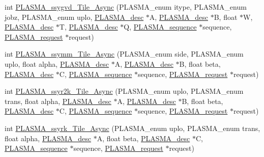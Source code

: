 \begin{DoxyCompactItemize}
\item 
int \hyperlink{group__float__Tile__Async_ga97d8d042fe9b588ddb504259c1960e44_ga97d8d042fe9b588ddb504259c1960e44}{P\+L\+A\+S\+M\+A\+\_\+ssygvd\+\_\+\+Tile\+\_\+\+Async} (P\+L\+A\+S\+M\+A\+\_\+enum itype, P\+L\+A\+S\+M\+A\+\_\+enum jobz, P\+L\+A\+S\+M\+A\+\_\+enum uplo, \hyperlink{structplasma__desc__t}{P\+L\+A\+S\+M\+A\+\_\+desc} $\ast$A, \hyperlink{structplasma__desc__t}{P\+L\+A\+S\+M\+A\+\_\+desc} $\ast$B, float $\ast$W, \hyperlink{structplasma__desc__t}{P\+L\+A\+S\+M\+A\+\_\+desc} $\ast$T, \hyperlink{structplasma__desc__t}{P\+L\+A\+S\+M\+A\+\_\+desc} $\ast$Q, \hyperlink{structplasma__sequence__t}{P\+L\+A\+S\+M\+A\+\_\+sequence} $\ast$sequence, \hyperlink{structplasma__request__t}{P\+L\+A\+S\+M\+A\+\_\+request} $\ast$request)
\item 
int \hyperlink{group__float__Tile__Async_ga0ebe5ea6bd5073337f099f5658a448d4_ga0ebe5ea6bd5073337f099f5658a448d4}{P\+L\+A\+S\+M\+A\+\_\+ssymm\+\_\+\+Tile\+\_\+\+Async} (P\+L\+A\+S\+M\+A\+\_\+enum side, P\+L\+A\+S\+M\+A\+\_\+enum uplo, float alpha, \hyperlink{structplasma__desc__t}{P\+L\+A\+S\+M\+A\+\_\+desc} $\ast$A, \hyperlink{structplasma__desc__t}{P\+L\+A\+S\+M\+A\+\_\+desc} $\ast$B, float beta, \hyperlink{structplasma__desc__t}{P\+L\+A\+S\+M\+A\+\_\+desc} $\ast$C, \hyperlink{structplasma__sequence__t}{P\+L\+A\+S\+M\+A\+\_\+sequence} $\ast$sequence, \hyperlink{structplasma__request__t}{P\+L\+A\+S\+M\+A\+\_\+request} $\ast$request)
\item 
int \hyperlink{group__float__Tile__Async_ga287e372b9d1ba9615e45738e628ee2f2_ga287e372b9d1ba9615e45738e628ee2f2}{P\+L\+A\+S\+M\+A\+\_\+ssyr2k\+\_\+\+Tile\+\_\+\+Async} (P\+L\+A\+S\+M\+A\+\_\+enum uplo, P\+L\+A\+S\+M\+A\+\_\+enum trans, float alpha, \hyperlink{structplasma__desc__t}{P\+L\+A\+S\+M\+A\+\_\+desc} $\ast$A, \hyperlink{structplasma__desc__t}{P\+L\+A\+S\+M\+A\+\_\+desc} $\ast$B, float beta, \hyperlink{structplasma__desc__t}{P\+L\+A\+S\+M\+A\+\_\+desc} $\ast$C, \hyperlink{structplasma__sequence__t}{P\+L\+A\+S\+M\+A\+\_\+sequence} $\ast$sequence, \hyperlink{structplasma__request__t}{P\+L\+A\+S\+M\+A\+\_\+request} $\ast$request)
\item 
int \hyperlink{group__float__Tile__Async_ga46d83814efe8df57c26e5e48f5bb12b4_ga46d83814efe8df57c26e5e48f5bb12b4}{P\+L\+A\+S\+M\+A\+\_\+ssyrk\+\_\+\+Tile\+\_\+\+Async} (P\+L\+A\+S\+M\+A\+\_\+enum uplo, P\+L\+A\+S\+M\+A\+\_\+enum trans, float alpha, \hyperlink{structplasma__desc__t}{P\+L\+A\+S\+M\+A\+\_\+desc} $\ast$A, float beta, \hyperlink{structplasma__desc__t}{P\+L\+A\+S\+M\+A\+\_\+desc} $\ast$C, \hyperlink{structplasma__sequence__t}{P\+L\+A\+S\+M\+A\+\_\+sequence} $\ast$sequence, \hyperlink{structplasma__request__t}{P\+L\+A\+S\+M\+A\+\_\+request} $\ast$request)

\end{DoxyCompactItemize}
